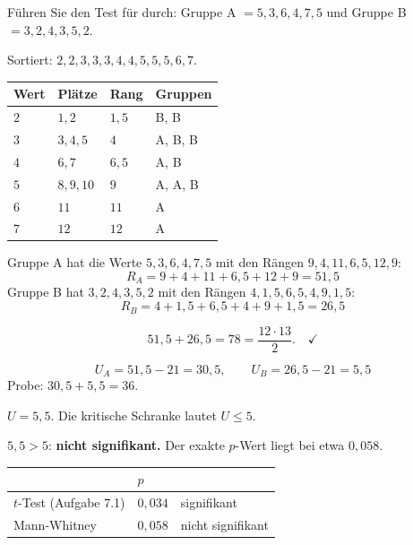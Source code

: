 \begin{aufgabe}
Führen Sie den Test für  durch: Gruppe A $= 5, 3, 6, 4, 7, 5$ und Gruppe B $= 3, 2, 4, 3, 5, 2$.

\loesung
{}
Sortiert: $2, 2, 3, 3, 3, 4, 4, 5, 5, 5, 6, 7$.

\begin{center}
{\small
\renewcommand{\arraystretch}{1.35}
\begin{tabular}{@{}P{1.2cm}P{2.0cm}P{1.8cm}P{2.4cm}@{}}
\toprule
\textbf{Wert} & \textbf{Plätze} & \textbf{Rang} & \textbf{Gruppen}\\
\midrule
$2$ & $1, 2$ & $1{,}5$ & B, B\\
$3$ & $3,4,5$ & $4$ & A, B, B\\
$4$ & $6,7$ & $6{,}5$ & A, B\\
$5$ & $8,9,10$ & $9$ & A, A, B\\
$6$ & $11$ & $11$ & A\\
$7$ & $12$ & $12$ & A\\
\bottomrule
\end{tabular}}
\end{center}

Gruppe A hat die Werte $5, 3, 6, 4, 7, 5$ mit den Rängen $9, 4, 11, 6{,}5, 12, 9$:
\[ R_A = 9 + 4 + 11 + 6{,}5 + 12 + 9 = 51{,}5 \]
Gruppe B hat $3, 2, 4, 3, 5, 2$ mit den Rängen $4, 1{,}5, 6{,}5, 4, 9, 1{,}5$:
\[ R_B = 4 + 1{,}5 + 6{,}5 + 4 + 9 + 1{,}5 = 26{,}5 \]

\[ 51{,}5 + 26{,}5 = 78 = \frac{12 \cdot 13}{2} . \quad \checkmark \]

\[ U_A = 51{,}5 - 21 = 30{,}5, \qquad U_B = 26{,}5 - 21 = 5{,}5 \]
Probe: $30{,}5 + 5{,}5 = 36$. \checkmark

$U = 5{,}5$. Die kritische Schranke lautet $U \le 5$.

$5{,}5 > 5$: \textbf{nicht signifikant.} Der exakte $p$-Wert liegt bei etwa $0{,}058$.

\begin{center}
\renewcommand{\arraystretch}{1.48}
\begin{tabular}{@{}P{3.0cm}P{2.0cm}P{2.6cm}@{}}
\toprule
& $p$ & \\
\midrule
$t$-Test (Aufgabe 7.1) & $0{,}034$ & \textcolor{akzent}{signifikant}\\
Mann-Whitney & $0{,}058$ & \textcolor{gruen}{nicht signifikant}\\
\bottomrule
\end{tabular}
\end{center}


\end{aufgabe}
